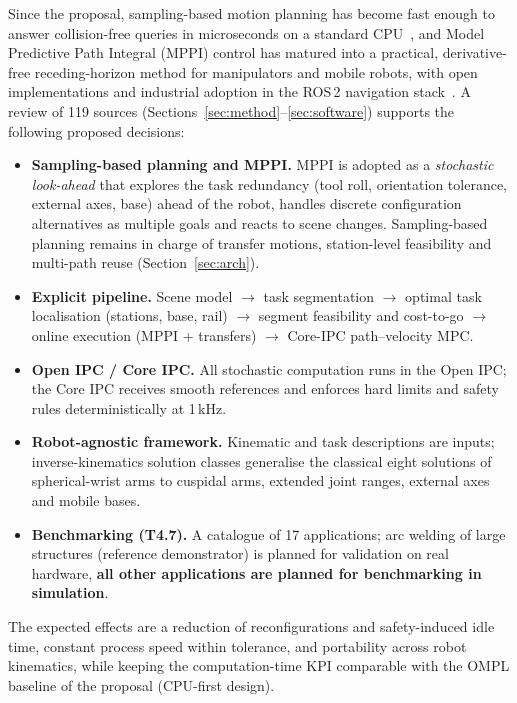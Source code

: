 \documentclass{plan4ari_report}
\begin{document}
Since the proposal, sampling-based motion planning has become fast enough to answer collision-free queries in microseconds on a standard CPU~\cite{thomason2024vamp}, and Model Predictive Path Integral (MPPI) control has matured into a practical, derivative-free receding-horizon method for manipulators and mobile robots, with open implementations and industrial adoption in the ROS\,2 navigation stack~\cite{williams2018tro,bhardwaj2021storm,macenski2023nav2survey}. A review of 119 sources (Sections~\ref{sec:method}--\ref{sec:software}) supports the following proposed decisions:
\begin{itemize}
\item \textbf{Sampling-based planning and MPPI.} MPPI is adopted as a \emph{stochastic look-ahead} that explores the task redundancy (tool roll, orientation tolerance, external axes, base) ahead of the robot, handles discrete configuration alternatives as multiple goals and reacts to scene changes. Sampling-based planning remains in charge of transfer motions, station-level feasibility and multi-path reuse (Section~\ref{sec:arch}).
\item \textbf{Explicit pipeline.} Scene model $\rightarrow$ task segmentation $\rightarrow$ optimal task localisation (stations, base, rail) $\rightarrow$ segment feasibility and cost-to-go $\rightarrow$ online execution (MPPI + transfers) $\rightarrow$ Core-IPC path--velocity MPC.
\item \textbf{Open IPC / Core IPC.} All stochastic computation runs in the Open IPC; the Core IPC receives smooth references and enforces hard limits and safety rules deterministically at 1\,kHz.
\item \textbf{Robot-agnostic framework.} Kinematic and task descriptions are inputs; inverse-kinematics solution classes generalise the classical eight solutions of spherical-wrist arms to cuspidal arms, extended joint ranges, external axes and mobile bases.
\item \textbf{Benchmarking (T4.7).} A catalogue of 17 applications; arc welding of large structures (reference demonstrator) is planned for validation on real hardware, \textbf{all other applications are planned for benchmarking in simulation}.
\end{itemize}
The expected effects are a reduction of reconfigurations and safety-induced idle time, constant process speed within tolerance, and portability across robot kinematics, while keeping the computation-time KPI comparable with the OMPL baseline of the proposal (CPU-first design).
\end{document}
